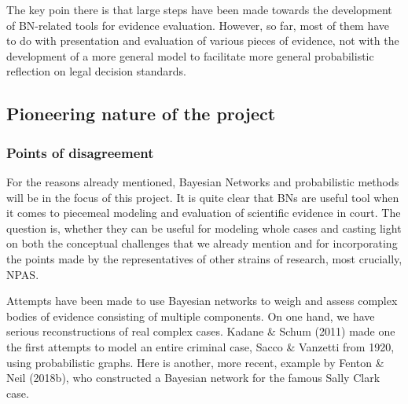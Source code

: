 \documentclass[11pt,dvipsnames,enabledeprecatedfontcommands]{scrartcl}
\begin{document}
\vspace{2mm}

The key poin there is that large steps have been made towards the
development of BN-related tools for evidence evaluation. However, so
far, most of them have to do with presentation and evaluation of various
pieces of evidence, not with the development of a more general model to
facilitate more general probabilistic reflection on legal decision
standards.

\subsection{Pioneering nature of the
project}\label{pioneering-nature-of-the-project}

\subsubsection{Points of disagreement}\label{points-of-disagreement}

For the reasons already mentioned, Bayesian Networks and probabilistic
methods will be in the focus of this project. It is quite clear that BNs
are useful tool when it comes to piecemeal modeling and evaluation of
scientific evidence in court. The question is, whether they can be
useful for modeling whole cases and casting light on both the conceptual
challenges that we already mention and for incorporating the points made
by the representatives of other strains of research, most crucially,
NPAS.

Attempts have been made to use Bayesian networks to weigh and assess
complex bodies of evidence consisting of multiple components. On one
hand, we have serious reconstructions of real complex cases. Kadane \&
Schum (2011) made one the first attempts to model an entire criminal
case, Sacco \& Vanzetti from 1920, using probabilistic graphs. Here is
another, more recent, example by Fenton \& Neil (2018b), who constructed
a Bayesian network for the famous Sally Clark case.

\noindent
\end{document}

